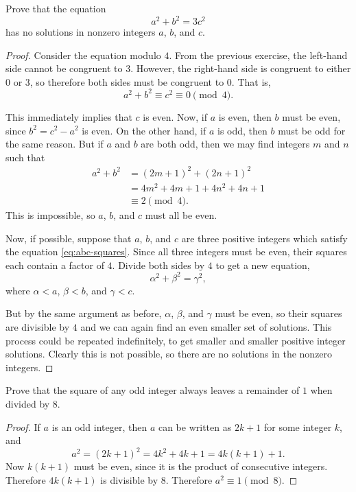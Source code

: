  Prove that the equation
\begin{equation}
  \label{eq:abc-squares}
  a^2 + b^2 = 3c^2
\end{equation}
has no solutions in nonzero integers $a$, $b$, and $c$.
\begin{proof}
  Consider the equation modulo $4$. From the previous exercise, the
  left-hand side cannot be congruent to $3$. However, the right-hand
  side is congruent to either $0$ or $3$, so therefore both sides must
  be congruent to $0$. That is,
  \begin{equation*}
    a^2 + b^2\equiv c^2\equiv0\pmod4.
  \end{equation*}

  This immediately implies that $c$ is even. Now, if $a$ is even, then
  $b$ must be even, since $b^2 = c^2-a^2$ is even. On the other hand,
  if $a$ is odd, then $b$ must be odd for the same reason. But if $a$
  and $b$ are both odd, then we may find integers $m$ and $n$ such
  that
  \begin{align*}
    a^2 + b^2 &= (2m+1)^2 + (2n+1)^2 \\
              &= 4m^2 + 4m + 1 + 4n^2 + 4n + 1 \\
              &\equiv 2\pmod4.
  \end{align*}
  This is impossible, so $a$, $b$, and $c$ must all be even.

  Now, if possible, suppose that $a$, $b$, and $c$ are three positive
  integers which satisfy the equation \eqref{eq:abc-squares}. Since
  all three integers must be even, their squares each contain a factor
  of $4$. Divide both sides by $4$ to get a new equation,
  \begin{equation*}
    \alpha^2 + \beta^2 = \gamma^2,
  \end{equation*}
  where $\alpha<a$, $\beta<b$, and $\gamma<c$.

  But by the same argument as before, $\alpha$, $\beta$, and $\gamma$
  must be even, so their squares are divisible by $4$ and we can again
  find an even smaller set of solutions. This process could be
  repeated indefinitely, to get smaller and smaller positive integer
  solutions. Clearly this is not possible, so there are no solutions
  in the nonzero integers.
\end{proof}

 Prove that the square of any odd integer always leaves a
remainder of $1$ when divided by $8$.
\begin{proof}
  If $a$ is an odd integer, then $a$ can be written as $2k + 1$ for
  some integer $k$, and
  \begin{equation*}
    a^2 = (2k + 1)^2 = 4k^2 + 4k + 1 = 4k(k + 1) + 1.
  \end{equation*}
  Now $k(k+1)$ must be even, since it is the product of consecutive
  integers. Therefore $4k(k+1)$ is divisible by $8$. Therefore
  $a^2\equiv1\pmod8$.
\end{proof}

